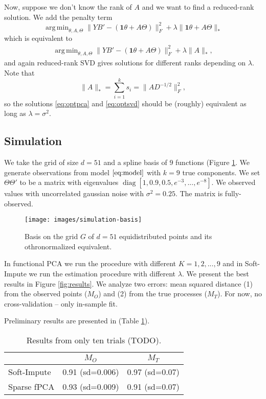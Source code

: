 \documentclass{article}
\DeclareMathOperator*{\argmin}{arg\,min}
\DeclareMathOperator*{\diag}{diag}
\begin{document}
Now, suppose we don't know the rank of $A$ and we want to find a reduced-rank solution. We add the penalty term
\[
\argmin_{\theta, A, \Theta} \| YB' - (\mathbf{1}\theta + A \Theta)\|_F^2 + \lambda\|\mathbf{1}\theta + A \Theta\|_*
\]
which is equivalent to
\begin{align}\label{eq:optsvd}
\argmin_{\theta, A, \Theta} \| YB' - (\mathbf{1}\theta + A \Theta)\|_F^2 + \lambda\|A\|_*,
\end{align}
and again reduced-rank SVD gives solutions for different ranks depending on $\lambda$.
Note that
\[
\|A\|_* = \sum_{i = 1}^k s_i = \| A D^{-1/2} \|_F^2,
\]
so the solutions \eqref{eq:optpca} and \eqref{eq:optsvd} should be (roughly) equivalent as long as $\lambda = \sigma^2$.

\subsection{Simulation}

We take the grid of size $d = 51$ and a spline basis of $9$ functions (Figure \ref{fig:basis}. We generate observations from model $\eqref{eq:model}$ with $k = 9$ true components. We set $\Theta\Theta'$ to be a matrix with eigenvalues $\diag[1,0.9,0.5,e^{-3},...,e^{-8}]$. We observed values with uncorrelated gaussian noise with $\sigma^2 = 0.25$. The matrix is fully-observed.

\begin{figure}[h]
  \texttt{[image: images/simulation-basis]}
  \caption{Basis on the grid $G$ of $d=51$ equidistributed points and its othronormalized equivalent.}
  \label{fig:basis}
\end{figure}

In functional PCA we run the procedure with different $K = 1,2,...,9$ and in Soft-Impute we run the estimation procedure with different $\lambda$. We present the best results in Figure \ref{fig:results}. We analyze two errors: mean squared distance (1) from the observed points ($M_O$) and (2) from the true processes ($M_T$). For now, no cross-validation -- only in-sample fit.

Preliminary results are presented in (Table \ref{tab:results}).
\begin{table}[h]
  \centering
\begin{tabular}{lcc}
                  & $M_O$ & $M_T$\\
\hline
Soft-Impute  & 0.91 (sd=0.006) & 0.97 (sd=0.07)\\ 
Sparse fPCA & 0.93 (sd=0.009) & 0.91 (sd=0.07)\\
\end{tabular}
  \caption{Results from only ten trials (TODO).}\label{tab:results}
\end{table}
\end{document}
